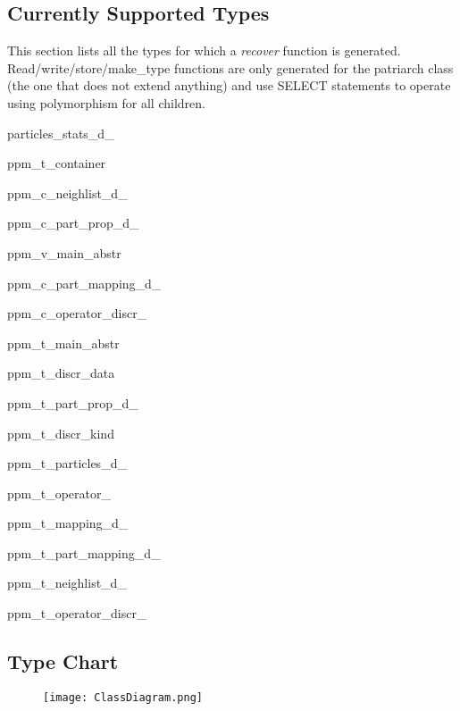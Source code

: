 \documentclass{article}
\begin{document}
\begin{tabular}{p{}p{}}
\end{tabular}

\subsection{Currently Supported Types}
This section lists all the types for which a \emph{recover} function is generated. Read/write/store/make\_type functions are only generated for the patriarch class (the one that does not extend anything) and use SELECT statements to operate using polymorphism for all children.
\begin{list}{}{}
\item particles\_stats\_d\_
\item ppm\_t\_container
\item ppm\_c\_neighlist\_d\_
\item ppm\_c\_part\_prop\_d\_
\item ppm\_v\_main\_abstr
\item ppm\_c\_part\_mapping\_d\_
\item ppm\_c\_operator\_discr\_
\item ppm\_t\_main\_abstr
\item ppm\_t\_discr\_data
\item ppm\_t\_part\_prop\_d\_
\item ppm\_t\_discr\_kind
\item ppm\_t\_particles\_d\_
\item ppm\_t\_operator\_
\item ppm\_t\_mapping\_d\_
\item ppm\_t\_part\_mapping\_d\_
\item ppm\_t\_neighlist\_d\_
\item ppm\_t\_operator\_discr\_
\end{list}

\subsection{Type Chart}
\begin{figure}[h!]
   \label{fig.typechart}
   \texttt{[image: ClassDiagram.png]}
\end{figure}
\end{document}
